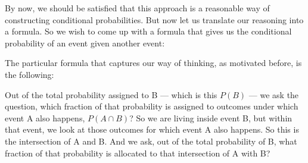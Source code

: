 \documentclass[pdftex, brazil, 12pt, twoside]{article}
\begin{document}
By now, we should be satisfied that this approach is a
reasonable way of constructing conditional probabilities.
But now let us translate our reasoning into a formula.
So we wish to come up with a formula that gives us the
conditional probability of an event given another event:

\begin{figure}[H]
  \begin{center}
  \end{center}
\end{figure}

The particular formula that captures our way of thinking,
as motivated before, is the following:

\begin{figure}[H]
  \begin{center}
  \end{center}
\end{figure}

Out of the total probability assigned to B ---
which is this $P(B)$ ---
we ask the question, which fraction of that probability
is assigned to outcomes under which event A also happens, $P(A \cap B)$?
So we are living inside event B, but within that event, we
look at those outcomes for which event A also happens.
So this is the intersection of A and B. And we ask, out of
the total probability of B, what fraction of that
probability is allocated to that intersection of A with B?
\end{document}
